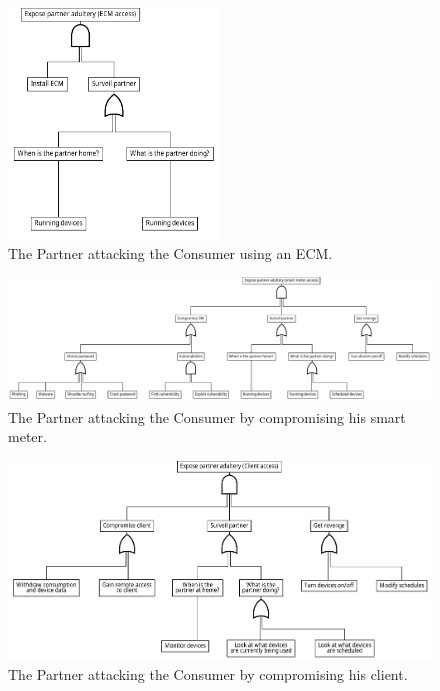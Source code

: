 \begin{figure}[h]
  \centering
  \includegraphics[width=0.5\textwidth]{figures/graphviz/partner_vs_consumer_ecm.pdf}
  \caption{The Partner attacking the Consumer using an ECM.}
  \label{fig:attack_trees:partner:cheater_ecm}
\end{figure}

\begin{figure}[h]
  \centering
  \includegraphics[angle=90,height=\textheight]{figures/graphviz/partner_vs_consumer_sm.pdf}
  \caption{The Partner attacking the Consumer by compromising his smart meter.}
  \label{fig:attack_trees:partner:cheater_sm}
\end{figure}

\begin{figure}[h]
  \includegraphics[width=\textwidth]{figures/graphviz/partner_vs_consumer_client.pdf}
  \caption{The Partner attacking the Consumer by compromising his client.}
  \label{fig:attack_trees:partner:cheater_client}
\end{figure}


